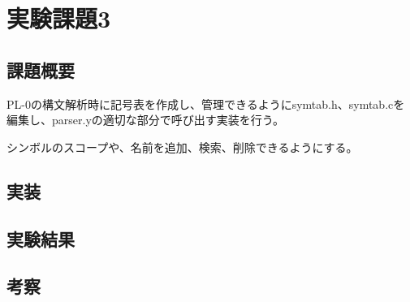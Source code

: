 \section{実験課題3}
\subsection{課題概要}
PL-0の構文解析時に記号表を作成し、管理できるようにsymtab.h、symtab.cを編集し、parser.yの適切な部分で呼び出す実装を行う。

シンボルのスコープや、名前を追加、検索、削除できるようにする。

\subsection{実装}




\subsection{実験結果}

\subsection{考察}
